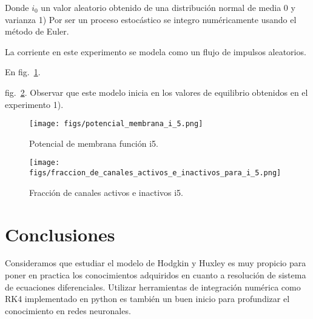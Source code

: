 \documentclass[aps,prl,twocolumn,groupedaddress]{revtex4-2}
\begin{document}
Donde $i_0$  un valor aleatorio obtenido de una distribución normal de media 0 y varianza 1) Por ser un proceso estocástico se integro numéricamente usando el método de Euler.

La corriente en este experimento se modela como un flujo de impulsos aleatorios.

En fig.~\ref{fig9}.


  fig.~\ref{fig10}.
Observar que este modelo inicia en los valores de equilibrio obtenidos en el experimento 1).




\begin{figure}[h!]
\centering
\texttt{[image: figs/potencial\_membrana\_i\_5.png]}
\caption{Potencial de membrana función i5. \label{fig9}}
\end{figure}





\begin{figure}[h!]
\centering
\texttt{[image: figs/fraccion\_de\_canales\_activos\_e\_inactivos\_para\_i\_5.png]}
\caption{Fracción de canales activos e inactivos i5. \label{fig10}}
\end{figure}


\section{Conclusiones}

Consideramos que estudiar el modelo de Hodgkin y Huxley es muy propicio para poner en practica los conocimientos adquiridos en cuanto a resolución de sistema de ecuaciones diferenciales. Utilizar herramientas de integración numérica como RK4 implementado en python es también un buen inicio para profundizar el conocimiento en redes neuronales.



%
\end{document}
